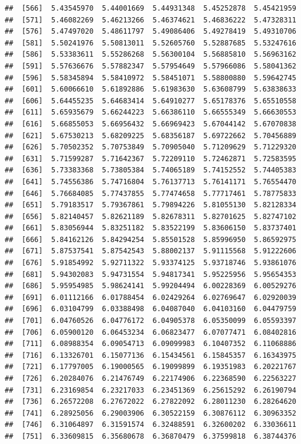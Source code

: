 \documentclass[
  11pt]{report}
\begin{document}
\begin{itemize}
\begin{verbatim}
##  [566]  5.43545970  5.44001669  5.44931348  5.45252878  5.45421959
##  [571]  5.46082269  5.46213266  5.46374621  5.46836222  5.47328311
##  [576]  5.47497020  5.48611797  5.49086406  5.49278419  5.49310706
##  [581]  5.50241976  5.50813011  5.52605760  5.52887685  5.53247616
##  [586]  5.53383611  5.55286268  5.56300104  5.56885810  5.56963162
##  [591]  5.57636676  5.57882347  5.57954649  5.57966086  5.58041362
##  [596]  5.58345894  5.58410972  5.58451071  5.58800880  5.59642745
##  [601]  5.60066610  5.61892886  5.61983630  5.63608799  5.63838633
##  [606]  5.64455235  5.64683414  5.64910277  5.65178376  5.65510558
##  [611]  5.65935679  5.66244223  5.66386110  5.66555349  5.66630553
##  [616]  5.66855053  5.66956432  5.66969423  5.67044142  5.67070838
##  [621]  5.67530213  5.68209225  5.68356187  5.69722662  5.70456889
##  [626]  5.70502352  5.70753849  5.70905040  5.71209629  5.71229320
##  [631]  5.71599287  5.71642367  5.72209110  5.72462871  5.72583595
##  [636]  5.73383368  5.73805384  5.74065189  5.74152552  5.74405383
##  [641]  5.74556386  5.74716804  5.76137713  5.76141171  5.76554470
##  [646]  5.76684085  5.77437855  5.77474658  5.77717461  5.78775833
##  [651]  5.79183517  5.79367861  5.79894226  5.81055130  5.82128334
##  [656]  5.82140457  5.82621189  5.82678311  5.82701625  5.82747102
##  [661]  5.83056944  5.83251182  5.83522199  5.83606150  5.83737401
##  [666]  5.84162126  5.84294254  5.85501528  5.85996950  5.86592975
##  [671]  5.87537541  5.87542543  5.88002137  5.91115568  5.91222606
##  [676]  5.91854992  5.92711322  5.93374125  5.93718746  5.93861076
##  [681]  5.94302083  5.94731554  5.94817341  5.95225956  5.95654353
##  [686]  5.95954985  5.98624141  5.99204494  6.00228369  6.00529276
##  [691]  6.01112166  6.01788454  6.02429264  6.02769647  6.02920039
##  [696]  6.03104799  6.03388498  6.04087040  6.04103160  6.04479759
##  [701]  6.04760526  6.04776172  6.04905378  6.05350099  6.05593397
##  [706]  6.05900120  6.06453234  6.06823477  6.07077471  6.08402816
##  [711]  6.08988354  6.09054713  6.09099983  6.10407352  6.11068886
##  [716]  6.13326701  6.15077136  6.15434561  6.15845357  6.16343975
##  [721]  6.17797005  6.19000565  6.19099899  6.19351983  6.20221767
##  [726]  6.20284076  6.21476749  6.22174906  6.22368590  6.22563227
##  [731]  6.23169854  6.23217033  6.23451369  6.25615292  6.26190794
##  [736]  6.26572208  6.27672022  6.27822092  6.28011230  6.28264620
##  [741]  6.28925056  6.29003906  6.30522159  6.30876112  6.30963352
##  [746]  6.31064897  6.31591574  6.32488591  6.32600202  6.33036611
##  [751]  6.33609815  6.35680678  6.36870479  6.37599818  6.38744376

\end{verbatim}
\end{itemize}
\end{document}
